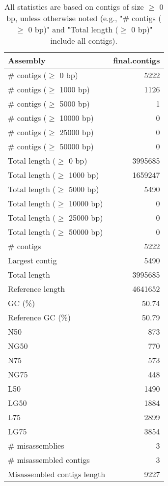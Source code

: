 \documentclass[12pt,a4paper]{article}
\begin{document}
\begin{table}[ht]
\begin{center}
\caption{All statistics are based on contigs of size $\geq$ 0 bp, unless otherwise noted (e.g., "\# contigs ($\geq$ 0 bp)" and "Total length ($\geq$ 0 bp)" include all contigs).}
\begin{tabular}{|l*{1}{|r}|}
\hline
Assembly & final.contigs \\ \hline
\# contigs ($\geq$ 0 bp) & 5222 \\ \hline
\# contigs ($\geq$ 1000 bp) & 1126 \\ \hline
\# contigs ($\geq$ 5000 bp) & 1 \\ \hline
\# contigs ($\geq$ 10000 bp) & 0 \\ \hline
\# contigs ($\geq$ 25000 bp) & 0 \\ \hline
\# contigs ($\geq$ 50000 bp) & 0 \\ \hline
Total length ($\geq$ 0 bp) & 3995685 \\ \hline
Total length ($\geq$ 1000 bp) & 1659247 \\ \hline
Total length ($\geq$ 5000 bp) & 5490 \\ \hline
Total length ($\geq$ 10000 bp) & 0 \\ \hline
Total length ($\geq$ 25000 bp) & 0 \\ \hline
Total length ($\geq$ 50000 bp) & 0 \\ \hline
\# contigs & 5222 \\ \hline
Largest contig & 5490 \\ \hline
Total length & 3995685 \\ \hline
Reference length & 4641652 \\ \hline
GC (\%) & 50.74 \\ \hline
Reference GC (\%) & 50.79 \\ \hline
N50 & 873 \\ \hline
NG50 & 770 \\ \hline
N75 & 573 \\ \hline
NG75 & 448 \\ \hline
L50 & 1490 \\ \hline
LG50 & 1884 \\ \hline
L75 & 2899 \\ \hline
LG75 & 3854 \\ \hline
\# misassemblies & 3 \\ \hline
\# misassembled contigs & 3 \\ \hline
Misassembled contigs length & 9227 \\ \hline

\end{tabular}
\end{center}
\end{table}
\end{document}
